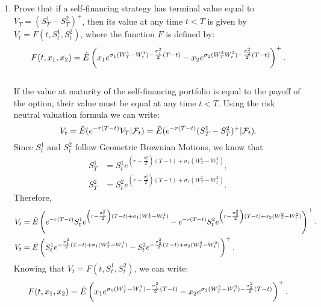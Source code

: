 \documentclass[handout,8pt]{beamer}
\begin{document}
\begin{frame}[allowframebreaks]{ }
\begin{enumerate}
\begin{enumerate}
        \item Prove that if a self-financing strategy has terminal value equal to $V_T=(S_T^1-S_T^2)^+$, then its value at any time $t<T$ is given by $V_t=F(t,S_t^1,S_t^2)$, where the function $F$ is defined by:
        \begin{equation}
            F(t,x_1,x_2) = \Tilde{E}\left(x_1e^{\sigma_1(W_T^1-W_t^1)-\frac{\sigma_1^2}{2}(T-t)}-x_2e^{\sigma_2(W_T^2W_t^2)-\frac{\sigma_2^2}{2}(T-t)}\right)^+.
        \end{equation}\\
        If the value at maturity of the self-financing portfolio is equal to the payoff of the option, their value must be equal at any time $t< T$. Using the risk neutral valuation formula we can write:
        \begin{equation*}
            V_t = \Tilde{E}(e^{-r(T-t)}V_T|\mathcal{F}_t) = \Tilde{E}(e^{-r(T-t)}(S_T^1 - S_T^2)^+|\mathcal{F}_t).
        \end{equation*}
        Since $S_t^1$ and $S_t^2$ follow Geometric Brownian Motions, we know that
        \begin{align*}
            S_T^1 &= S_t^1e^{\left(r - \frac{\sigma_1^2}{2}\right)(T-t) + \sigma_1(W_T^1-W_t^1)},\\
            S_T^2 &= S_t^2e^{\left(r - \frac{\sigma_2^2}{2}\right)(T-t) + \sigma_1(W_T^2-W_t^2)}.
        \end{align*}
        Therefore,
        \begin{align*}
            V_t &= \Tilde{E}\left(e^{-r(T-t)}S_t^1e^{\left(r-\frac{\sigma_1^2}{2}\right)(T-t)+\sigma_1(W_T^1-W_t^1)} - e^{-r(T-t)}S_t^2e^{\left(r - \frac{\sigma_2^2}{2}\right) (T-t) + \sigma_2(W_T^2-W_t^2)}\right)^+.\\
            V_t &= \Tilde{E}\left(S_t^1e^{-\frac{\sigma_1^2}{2}(T-t) + \sigma_1(W_T^1-W_t^1)}-S_t^2e^{-\frac{\sigma_2^2}{2}(T-t) + \sigma_2(W_T^2-W_t^2)}\right)^+.
        \end{align*}
        Knowing that $V_t=F(t,S_t^1,S_t^2)$, we can write:
        \begin{equation*}
            F(t,x_1,x_2) = \Tilde{E}\left(x_1e^{\sigma_1(W_T^1-W_t^1)-\frac{\sigma_1^2}{2}(T-t)} - x_2e^{\sigma_2(W_T^2-W_t^2)-\frac{\sigma_2^2}{2}(T-t)}\right)^+.
        \end{equation*}
        

\end{enumerate}
\end{enumerate}
\end{frame}
\end{document}
